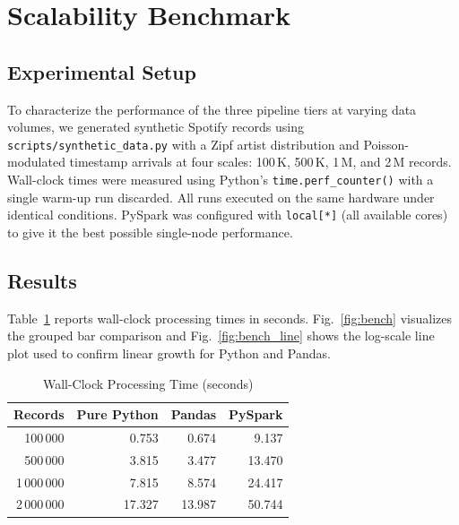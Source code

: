 \documentclass[conference]{IEEEtran}
\newcommand{\tabletight}{\footnotesize\setlength{\tabcolsep}{3.5pt}\renewcommand{\arraystretch}{1.08}}
\begin{document}
\section{Scalability Benchmark}
\label{sec:benchmark}

\subsection{Experimental Setup}

To characterize the performance of the three pipeline tiers at varying data
volumes, we generated synthetic Spotify records using
\texttt{scripts/synthetic\_data.py} with a Zipf artist distribution and
Poisson-modulated timestamp arrivals at four scales: 100\,K, 500\,K, 1\,M,
and 2\,M records. Wall-clock times were measured using Python's
\texttt{time.perf\_counter()} with a single warm-up run discarded.
All runs executed on the same hardware under identical conditions.
PySpark was configured with \texttt{local[*]} (all available cores) to give
it the best possible single-node performance.

\subsection{Results}

Table~\ref{tab:bench} reports wall-clock processing times in seconds.
Fig.~\ref{fig:bench} visualizes the grouped bar comparison and
Fig.~\ref{fig:bench_line} shows the log-scale line plot used to
confirm linear growth for Python and Pandas.

\begin{table}[!t]
\caption{Wall-Clock Processing Time (seconds)}
\label{tab:bench}
\centering
\tabletight
\begin{tabular}{rrrr}
\toprule
\textbf{Records} & \textbf{Pure Python} & \textbf{Pandas} & \textbf{PySpark} \\
\midrule
100\,000    & 0.753  & 0.674  & 9.137  \\
500\,000    & 3.815  & 3.477  & 13.470 \\
1\,000\,000 & 7.815  & 8.574  & 24.417 \\
2\,000\,000 & 17.327 & 13.987 & 50.744 \\
\bottomrule
\end{tabular}
\end{table}
\end{document}
